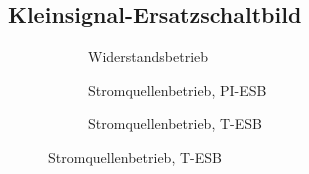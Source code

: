 \subsection{Kleinsignal-Ersatzschaltbild}
\begin{figure}[htbp]
        \centering
        \begin{subfigure}[b]{5cm}
                \centering
                \caption{Widerstandsbetrieb}
        \end{subfigure} \qquad \qquad
        \begin{subfigure}[b]{5cm}
                \centering
                \caption{Stromquellenbetrieb, PI-ESB}
        \end{subfigure} \qquad \qquad
        \begin{subfigure}[b]{5cm}
                \centering
                \caption{Stromquellenbetrieb, T-ESB}
        \end{subfigure}        
\end{figure}
